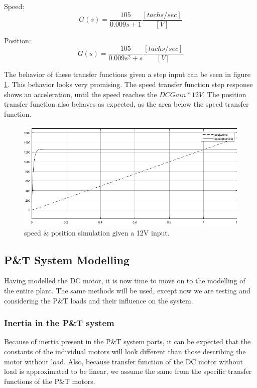 Speed:
\begin{equation}
G(s)=\frac{105}{0.009s+1} \frac{[tachs/sec]}{[V]}
\end{equation}

Position:
\begin{equation}
G(s)=\frac{105}{0.009s^2+s} \frac{[tachs/sec]}{[V]}
\end{equation}

The behavior of these transfer functions given a step input can be seen in figure \ref{fig:SpeedPosSim12V}. This behavior looks very promising. The speed transfer function step response shows an acceleration, until the speed reaches the $DC Gain * 12V$. The position transfer function also behaves as expected, as the area below the speed transfer function. 

\begin{figure}[h!]
\centering
\includegraphics[scale=0.6]{Billeder/SpeedPosSim12V.png}
\caption{speed \& position simulation given a 12V input.}
\label{fig:SpeedPosSim12V}
\end{figure}

\subsection{P\&T System Modelling}
Having modelled the DC motor, it is now time to move on to the modelling of the entire plant. The same methods will be used, except now we are testing and considering the P\&T loads and their influence on the system.

\subsubsection{Inertia in the P\&T system}
Because of inertia present in the P\&T system parts, it can be expected that the constants of the individual motors will look different than those describing the motor without load. Also, because transfer function of the DC motor without load is approximated to be linear, we assume the same from the specific transfer functions of the P\&T motors.

